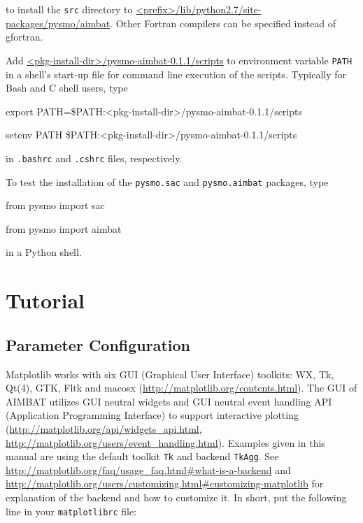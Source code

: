 \documentclass[12pt, titlepage]{article}
\newenvironment{lyxcode}
{\begin{list}{}{
\setlength{\rightmargin}{\leftmargin}
\setlength{\listparindent}{0pt}%
\raggedright
\setlength{\itemsep}{0pt}
\setlength{\parsep}{0pt}
\normalfont\ttfamily}%
 \item[]}
{\end{list}}
\begin{document}
to install the \texttt{src} directory to \url{<prefix>/lib/python2.7/site-packages/pysmo/aimbat}.
Other Fortran compilers can be specified instead of gfortran.


Add \url{<pkg-install-dir>/pysmo-aimbat-0.1.1/scripts} to environment variable \texttt{PATH} in a shell's start-up file for command line execution of the scripts. Typically for Bash and C shell users, type 

\begin{lyxcode}
export PATH=\$PATH:<pkg-install-dir>/pysmo-aimbat-0.1.1/scripts

setenv PATH \$PATH:<pkg-install-dir>/pysmo-aimbat-0.1.1/scripts
\end{lyxcode}

in \texttt{.bashrc} and \texttt{.cshrc} files, respectively.

To test the installation of the \texttt{pysmo.sac} and \texttt{pysmo.aimbat} packages, type

\begin{lyxcode}
from pysmo import sac

from pysmo import aimbat

\end{lyxcode}

in a Python shell.



\newpage
\section{Tutorial}

\subsection{Parameter Configuration}



Matplotlib works with six GUI (Graphical User Interface) toolkits: WX, Tk, Qt(4), GTK, Fltk and macosx (\url{http://matplotlib.org/contents.html}).
The GUI of AIMBAT utilizes GUI neutral widgets and GUI neutral event handling API (Application Programming Interface) to support interactive plotting (\url{http://matplotlib.org/api/widgets_api.html}, \url{http://matplotlib.org/users/event_handling.html}). 
Examples given in this manual are using the default toolkit \texttt{Tk} and backend \texttt{TkAgg}.
See \url{http://matplotlib.org/faq/usage_faq.html#what-is-a-backend}
and
\url{http://matplotlib.org/users/customizing.html#customizing-matplotlib}
for explanation of the backend and how to customize it. 
In short, put the following line in your \texttt{matplotlibrc} file:
\end{document}
